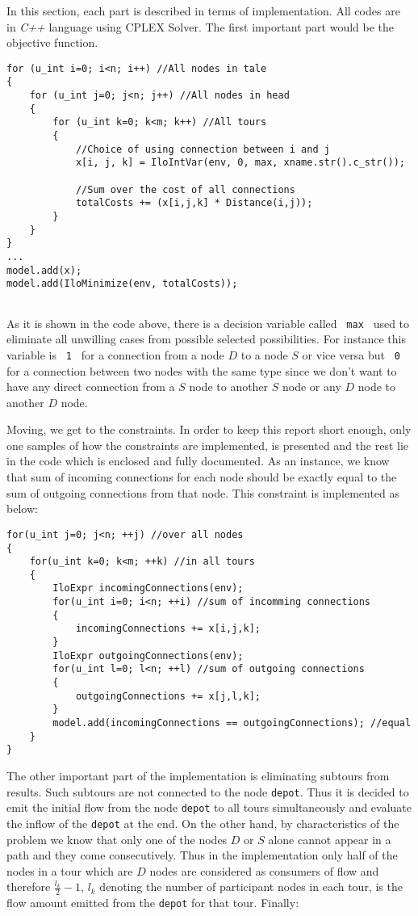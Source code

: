 In this section, each part is described in terms of implementation. All codes
are in {\it C++} language using CPLEX Solver.
The first important part would be the objective function.

\begin{lstlisting}
for (u_int i=0; i<n; i++) //All nodes in tale
{
    for (u_int j=0; j<n; j++) //All nodes in head
    {
    	for (u_int k=0; k<m; k++) //All tours
        {
            //Choice of using connection between i and j
            x[i, j, k] = IloIntVar(env, 0, max, xname.str().c_str());
            
            //Sum over the cost of all connections
            totalCosts += (x[i,j,k] * Distance(i,j));
        }
    }
}
...
model.add(x);
model.add(IloMinimize(env, totalCosts));
     
\end{lstlisting}

As it is shown in the code above, there is a decision variable called
\texttt{ max } used to eliminate all unwilling cases from possible selected
possibilities. For instance this variable is \texttt{ 1 } for a connection from
a node $D$ to a node $S$ or vice versa but \texttt{ 0 } for a connection between
two nodes with the same type since we don't want to have any direct connection
from a $S$ node to another $S$ node or any $D$ node to another $D$ node.

Moving, we get to the constraints. In order to keep this report short enough,
only one samples of how the constraints are implemented, is presented and the
rest lie in the code which is enclosed and fully documented.
As an instance, we know that sum of incoming connections for each node should
be exactly equal to the sum of outgoing connections from that node. This constraint is implemented as below:

\begin{lstlisting}
for(u_int j=0; j<n; ++j) //over all nodes
{
    for(u_int k=0; k<m; ++k) //in all tours 
    {
        IloExpr incomingConnections(env);
        for(u_int i=0; i<n; ++i) //sum of incomming connections
        {
            incomingConnections += x[i,j,k];
        }
        IloExpr outgoingConnections(env);
        for(u_int l=0; l<n; ++l) //sum of outgoing connections
        {
            outgoingConnections += x[j,l,k];
        }
        model.add(incomingConnections == outgoingConnections); //equal
    }
}
\end{lstlisting}

The other important part of the implementation is eliminating subtours from
results. Such subtours are not connected to the node \texttt{depot}. Thus it is
decided to emit the initial flow from the node \texttt{depot} to all tours
simultaneously and evaluate the inflow of the  \texttt{depot} at the end. On the
other hand, by characteristics of the problem we know that only one of the nodes
$D$ or $S$ alone cannot appear in a path and they come consecutively. Thus in
the implementation only half of the nodes in a tour which are $D$ nodes are
considered as consumers of flow and therefore $\frac{l_k}{2}-1$, $l_k$ denoting
the number of participant nodes in each tour, is the flow amount emitted from
the \texttt{depot} for that tour.
Finally:

